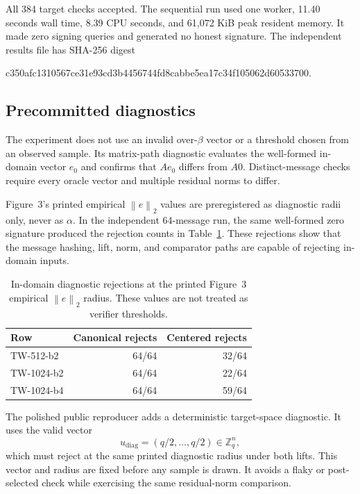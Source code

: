 \documentclass[10pt,a4paper]{article}
\newcommand{\Z}{\mathbb{Z}}
\newcommand{\norm}[1]{\left\lVert #1\right\rVert_2}
\begin{document}
All 384 target checks accepted. The sequential run used one worker, 11.40
seconds wall time, 8.39 CPU seconds, and 61,072 KiB peak resident memory. It
made zero signing queries and generated no honest signature. The independent
results file has SHA-256 digest
\begin{center}
\small\ttfamily
c350afc1310567ce31e93cd3b4456744fd8cabbe5ea17c34f105062d60533700.
\end{center}

\subsection{Precommitted diagnostics}

The experiment does not use an invalid over-$\beta$ vector or a threshold
chosen from an observed sample. Its matrix-path diagnostic evaluates the
well-formed in-domain vector $e_0$ and confirms that $Ae_0$ differs from
$A0$. Distinct-message checks require every oracle vector and multiple
residual norms to differ.

Figure~3's printed empirical $\norm{e}$ values are preregistered as diagnostic
radii only, never as $\alpha$. In the independent 64-message run, the same
well-formed zero signature produced the rejection counts in
Table~\ref{tab:diagnostics}. These rejections show that the message hashing,
lift, norm, and comparator paths are capable of rejecting in-domain inputs.

\begin{table}[ht]
\centering
\small
\begin{tabular}{@{}lrr@{}}
\toprule
Row & Canonical rejects & Centered rejects\\
\midrule
TW-512-b2  & 64/64 & 32/64\\
TW-1024-b2 & 64/64 & 22/64\\
TW-1024-b4 & 64/64 & 59/64\\
\bottomrule
\end{tabular}
\caption{In-domain diagnostic rejections at the printed Figure~3 empirical
$\norm{e}$ radius. These values are not treated as verifier thresholds.}
\label{tab:diagnostics}
\end{table}

The polished public reproducer adds a deterministic target-space diagnostic.
It uses the valid vector
\[
  u_{\mathrm{diag}}=(q/2,\ldots,q/2)\in\Z_q^n,
\]
which must reject at the same printed diagnostic radius under both lifts. This
vector and radius are fixed before any sample is drawn. It avoids a flaky or
post-selected check while exercising the same residual-norm comparison.
\end{document}
